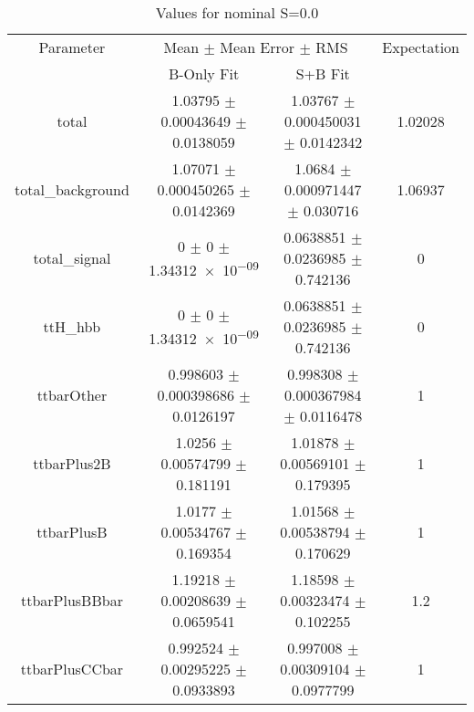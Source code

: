 \begin{table}
\centering
\caption{Values for nominal S=0.0}
\begin{tabular}{cccc}
\toprule
Parameter & \multicolumn{2}{c}{Mean $\pm$ Mean Error $\pm$ RMS} & Expectation\\
 & B-Only Fit & S+B Fit & \\
\midrule
total & \num{1.03795} $\pm$ \num{0.00043649} $\pm$ \num{0.0138059} & \num{1.03767} $\pm$ \num{0.000450031} $\pm$ \num{0.0142342} & \num{1.02028}\\
total\_background & \num{1.07071} $\pm$ \num{0.000450265} $\pm$ \num{0.0142369} & \num{1.0684} $\pm$ \num{0.000971447} $\pm$ \num{0.030716} & \num{1.06937}\\
total\_signal & \num{0} $\pm$ \num{0} $\pm$ \num{1.34312e-09} & \num{0.0638851} $\pm$ \num{0.0236985} $\pm$ \num{0.742136} & \num{0}\\
ttH\_hbb & \num{0} $\pm$ \num{0} $\pm$ \num{1.34312e-09} & \num{0.0638851} $\pm$ \num{0.0236985} $\pm$ \num{0.742136} & \num{0}\\
ttbarOther & \num{0.998603} $\pm$ \num{0.000398686} $\pm$ \num{0.0126197} & \num{0.998308} $\pm$ \num{0.000367984} $\pm$ \num{0.0116478} & \num{1}\\
ttbarPlus2B & \num{1.0256} $\pm$ \num{0.00574799} $\pm$ \num{0.181191} & \num{1.01878} $\pm$ \num{0.00569101} $\pm$ \num{0.179395} & \num{1}\\
ttbarPlusB & \num{1.0177} $\pm$ \num{0.00534767} $\pm$ \num{0.169354} & \num{1.01568} $\pm$ \num{0.00538794} $\pm$ \num{0.170629} & \num{1}\\
ttbarPlusBBbar & \num{1.19218} $\pm$ \num{0.00208639} $\pm$ \num{0.0659541} & \num{1.18598} $\pm$ \num{0.00323474} $\pm$ \num{0.102255} & \num{1.2}\\
ttbarPlusCCbar & \num{0.992524} $\pm$ \num{0.00295225} $\pm$ \num{0.0933893} & \num{0.997008} $\pm$ \num{0.00309104} $\pm$ \num{0.0977799} & \num{1}\\
\bottomrule
\end{tabular}
\end{table}